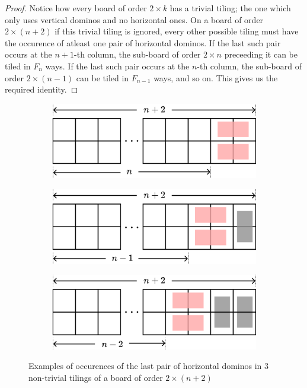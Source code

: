 \begin{proof}	
Notice how every board of order $2\times k$ has a trivial tiling; the one which only uses vertical dominos and no horizontal ones. On a board of order $2\times \left( n+2 \right)$ if this trivial tiling is ignored, every other possible tiling must have the occurence of atleast one pair of horizontal dominos. If the last such pair occurs at the $n+1$-th column, the sub-board of order  $2\times n$ preceeding it can be tiled in $F_{n}$ ways. If the last such pair occurs at the $n$-th column, the sub-board of order $2\times \left( n-1 \right)$ can be tiled in $F_{n-1}$ ways, and so on. This gives us the required identity. 
\end{proof}
\begin{figure}[H]
		\centering
		\begin{subfigure}[b]{0.3\textwidth}
			\centering
			\includegraphics[scale=0.6]{Images/Figure7_1.png}
			\caption{}
		\end{subfigure}
		\vfill
		\begin{subfigure}[b]{0.3\textwidth}
			\centering
			\includegraphics[scale=0.6]{Images/Figure7_2.png}
			\caption{}
		\end{subfigure}
		\vfill
		\begin{subfigure}[b]{0.3\textwidth}
			\centering
			\includegraphics[scale=0.6]{Images/Figure7_3.png}
			\caption{}
		\end{subfigure}
\caption{Examples of occurences of the last pair of horizontal dominos in $3$ non-trivial tilings of a board of order $2\times \left( n+2 \right)$}
\label{f:1.7}
\end{figure}

